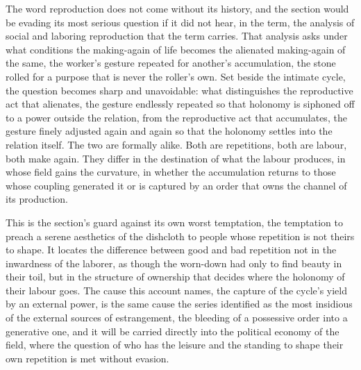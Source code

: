 The word reproduction does not come without its history, and the section would be evading its most serious question if it did not hear, in the term, the analysis of social and laboring reproduction that the term carries. That analysis asks under what conditions the making-again of life becomes the alienated making-again of the same, the worker's gesture repeated for another's accumulation, the stone rolled for a purpose that is never the roller's own. Set beside the intimate cycle, the question becomes sharp and unavoidable: what distinguishes the reproductive act that alienates, the gesture endlessly repeated so that holonomy is siphoned off to a power outside the relation, from the reproductive act that accumulates, the gesture finely adjusted again and again so that the holonomy settles into the relation itself. The two are formally alike. Both are repetitions, both are labour, both make again. They differ in the destination of what the labour produces, in whose field gains the curvature, in whether the accumulation returns to those whose coupling generated it or is captured by an order that owns the channel of its production.


This is the section's guard against its own worst temptation, the temptation to preach a serene aesthetics of the dishcloth to people whose repetition is not theirs to shape. It locates the difference between good and bad repetition not in the inwardness of the laborer, as though the worn-down had only to find beauty in their toil, but in the structure of ownership that decides where the holonomy of their labour goes. The cause this account names, the capture of the cycle's yield by an external power, is the same cause the series identified as the most insidious of the external sources of estrangement, the bleeding of a possessive order into a generative one, and it will be carried directly into the political economy of the field, where the question of who has the leisure and the standing to shape their own repetition is met without evasion.

